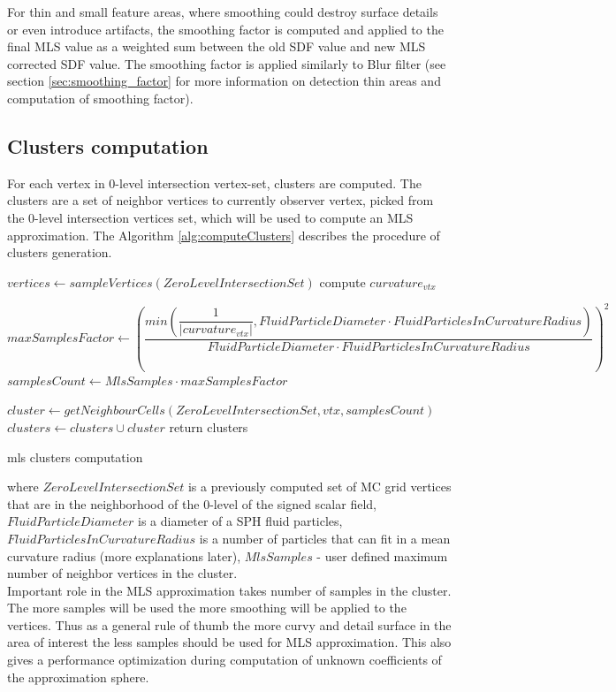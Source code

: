 For thin and small feature areas, where smoothing could destroy surface details or even introduce artifacts, the smoothing factor is computed and applied to the final MLS value as a weighted sum between the old SDF value and new MLS corrected SDF value. The smoothing factor is applied similarly to Blur filter (see section \ref{sec:smoothing_factor} for more information on detection thin areas and computation of smoothing factor).\\

\subsection{Clusters computation}
For each vertex in  0-level intersection vertex-set, clusters are computed. The clusters are a set of neighbor vertices to currently observer vertex, picked from the 0-level intersection vertices set, which will be used to compute an MLS approximation. The Algorithm \ref{alg:computeClusters} describes the procedure of clusters generation.
\begin{algorithm}[H]
	\scriptsize
	\begin{algorithmic}
			\State $vertices \gets sampleVertices(ZeroLevelIntersectionSet)$
				\State compute $curvature_{vtx}$

				\State $maxSamplesFactor \gets \left(\dfrac{min(\dfrac{1}{|curvature_{vtx}|}, FluidParticleDiameter \cdot FluidParticlesInCurvatureRadius)}{FluidParticleDiameter \cdot FluidParticlesInCurvatureRadius}\right)^2$
				\State $samplesCount \gets MlsSamples \cdot maxSamplesFactor$

				\State $cluster \gets getNeighbourCells(ZeroLevelIntersectionSet, vtx, samplesCount)$
				\State $clusters \gets clusters \cup cluster$ 
			\EndFor
			\State return clusters
	\end{algorithmic}
	\caption{mls clusters computation}
	\label{alg:computeClusters}
\end{algorithm}
where $ZeroLevelIntersectionSet$ is a previously computed set of MC grid vertices that are in the neighborhood of the 0-level of the signed scalar field, $FluidParticleDiameter$ is a diameter of a SPH fluid particles, $FluidParticlesInCurvatureRadius$ is a number of particles that can fit in a mean curvature radius (more explanations later), $MlsSamples$ - user defined maximum number of neighbor vertices in the cluster.\\
Important role in the MLS approximation takes number of samples in the cluster. The more samples will be used the more smoothing will be applied to the vertices. Thus as a general rule of thumb the more curvy and detail surface in the area of interest the less samples should be used for MLS approximation. This also gives a performance optimization during computation of unknown coefficients of the approximation sphere.\\
